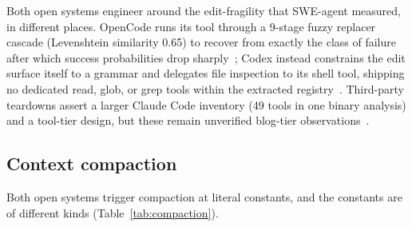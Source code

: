 \documentclass{article}
\newcommand{\codex}[0]{Codex}
\newcommand{\occ}[0]{OpenCode}
\newcommand{\ccc}[0]{Claude Code}
\begin{document}
Both open systems engineer around the edit-fragility that SWE-agent
measured, in different places. \occ{} runs its  tool through a
9-stage fuzzy replacer cascade (Levenshtein similarity 0.65) to recover
from exactly the class of failure after which success probabilities drop
sharply~\citep{yang2024sweagent,opencodeRepo}; \codex{} instead
constrains the edit surface itself to a grammar and delegates file
inspection to its shell tool, shipping no dedicated read, glob, or grep
tools within the extracted registry~\citep{codexRepo}. Third-party
teardowns assert a larger \ccc{} inventory (49 tools in one binary
analysis) and a tool-tier design, but these remain unverified blog-tier
observations~\citep{tenguDecoded,minusXTeardown}.

\subsection{Context compaction}
\label{sec:compaction}

Both open systems trigger compaction at literal constants, and the
constants are of different kinds (Table~\ref{tab:compaction}).
\end{document}

